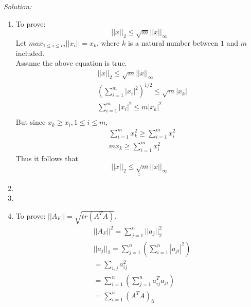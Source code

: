 \documentclass[fleqn]{article}
\newenvironment{solution}
    {\textit{Solution:}}
    {}
\begin{document}
\begin{solution}
\begin{enumerate}[label=(\alph*)]
        \item To prove:
        \begin{equation*}
            || x ||_{2} \leq \sqrt{m} || x ||_{\infty}
        \end{equation*}
        Let $max_{1 \leq i \leq m}  ||x_i|| = x_k$, where $k$ is a natural number between $1$ and $m$ included.\\
        Assume the above equation is true.
        \begin{equation*}
            \begin{split}
                &|| x ||_{2} \leq \sqrt{m} || x ||_{\infty}\\
                &(\sum_{i=1}^{m}| x_i |^{2})^{1/2} \leq \sqrt{m} | x_k|\\
                &\sum_{i=1}^{m}| x_i |^{2} \leq m | x_k|^{2}\\
            \end{split}
        \end{equation*}
        But since $x_k \geq x_i, 1 \leq i \leq m$, 
        \begin{equation*}
            \begin{split}
                &\sum_{i = 1}^{m} x_{k}^{2} \geq \sum_{i = 1}^{m} x_{i}^{2}\\
                &m x_{k} \geq \sum_{i = 1}^{m} x_{i}^2
            \end{split}
        \end{equation*} 
        Thus it follows that
        \begin{equation*}
            \underline{\underline{|| x ||_{2} \leq \sqrt{m} || x ||_{\infty}}}
        \end{equation*}
        \item
        \item
        \item 
        To prove: $||A_F|| = \sqrt{tr(A^{T}A)}$.
        \begin{equation*}
            \begin{split}
                &||A_F||^{2} = \sum_{j=1}^{n}|| a_j||_2^{2}\\
                &|| a_j ||_{2} = \sum_{j=1}^{n}(\sum_{i=1}^{n}| a_{ji}|^{2})\\
                &=\sum_{i,j}a_{ij}^{2}\\
                &= \sum_{i=1}^{n}(\sum_{j=1}^{n}a_{ij}^{T}a_{ji})\\
                &=\sum_{i=1}^{n}(A^{T}A)_{ii}\\

\end{split}
\end{equation*}
\end{enumerate}
\end{solution}
\end{document}
